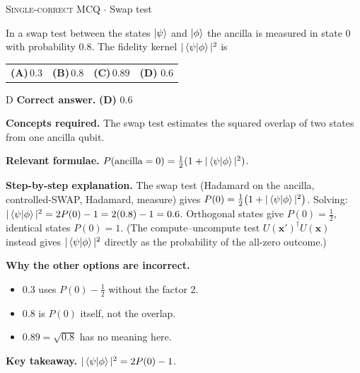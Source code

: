\documentclass[11pt,a4paper]{article}
\newcommand{\optlabel}[1]{\textbf{(#1)}}
\newcommand{\correctlabel}[1]{\textcolor{okgreen}{\textbf{(#1)}\,\ding{51}}}
\newenvironment{qitem}[1]{\begin{list}{}{\setlength{\leftmargin}{3.3em}\setlength{\labelwidth}{3.1em}%
  \setlength{\labelsep}{0.2em}\setlength{\topsep}{3pt}\setlength{\parsep}{3pt}}\item[\textbf{Q.#1}\hfill]}{\end{list}}
\newcommand{\qsep}{\par\vspace{2pt}{\color{black!15}\hrule}\vspace{4pt}}
\newcommand{\qmeta}[2]{{\footnotesize\color{black!60}\textsc{#1} \;$\cdot$\; #2}\par}
\begin{document}
\begin{qitem}{46}
\qmeta{Single-correct MCQ}{Swap test}
In a swap test between the states $\ket\psi$ and $\ket\phi$ the ancilla is measured in state $0$ with probability $0.8$.
The fidelity kernel $|\braket{\psi|\phi}|^2$ is
\par\smallskip\noindent\begin{tabularx}{\linewidth}{@{}*{4}{L}@{}}
\optlabel{A}\,$0.3$ & \optlabel{B}\,$0.8$ & \optlabel{C}\,$0.89$ & \correctlabel{D}\,$0.6$
\end{tabularx}
\end{qitem}
\begin{solbox}{D}
\textbf{\color{brand}Correct answer.} \textcolor{okgreen}{\textbf{(D)}} $0.6$

\textbf{\color{brand}Concepts required.} The swap test estimates the squared overlap of two states from one ancilla qubit.

\textbf{\color{brand}Relevant formulae.} $P(\text{ancilla} = 0) = \frac12(1 + |\braket{\psi|\phi}|^2)$.

\textbf{\color{brand}Step-by-step explanation.} The swap test (Hadamard on the ancilla, controlled-SWAP, Hadamard, measure) gives
$P(0) = \frac12\big(1 + |\braket{\psi|\phi}|^2\big)$. Solving: $|\braket{\psi|\phi}|^2 = 2P(0) - 1 = 2(0.8) - 1 = 0.6$.
Orthogonal states give $P(0) = \frac12$, identical states $P(0) = 1$. (The compute--uncompute test $U(\mathbf x')^\dagger U(\mathbf x)$
instead gives $|\braket{\psi|\phi}|^2$ directly as the probability of the all-zero outcome.)

\textbf{\color{brand}Why the other options are incorrect.}
\begin{itemize}[leftmargin=2.4em, itemsep=1pt, topsep=2pt]
\item[\textbf{(A)}] $0.3$ uses $P(0) - \frac12$ without the factor 2.
\item[\textbf{(B)}] $0.8$ is $P(0)$ itself, not the overlap.
\item[\textbf{(C)}] $0.89 = \sqrt{0.8}$ has no meaning here.
\end{itemize}
\textbf{\color{brand}Key takeaway.} $|\braket{\psi|\phi}|^2 = 2P(0) - 1$.
\end{solbox}
\qsep
\end{document}
